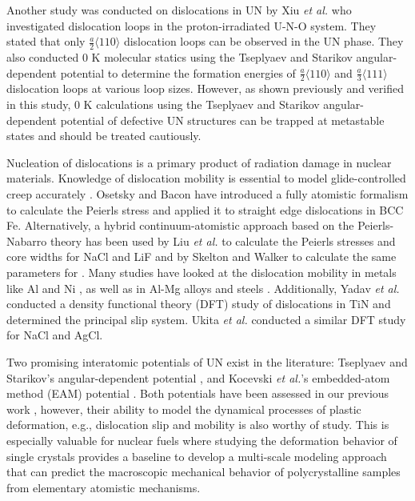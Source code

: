 \documentclass[applsci,article,submit,pdftex,moreauthors]{Definitions/mdpi}
\newcommand{\?}{\stackrel{?}{=}}
\begin{document}
Another study was conducted on dislocations in UN by Xiu \textit{et al.} \cite{Xiu2021} who investigated dislocation loops in the proton-irradiated U-N-O system. They stated that only $\frac{a}{2} \langle 110 \rangle$ dislocation loops can be observed in the UN phase. They also conducted 0 K molecular statics using the Tseplyaev and Starikov angular-dependent potential \cite{Tseplyaev2016} to determine the formation energies of $\frac{a}{2} \langle 110 \rangle$ and $\frac{a}{3} \langle 111 \rangle$ dislocation loops at various loop sizes. However, as shown previously \cite{AbdulHameed2024} and verified in this study, 0 K calculations using the Tseplyaev and Starikov angular-dependent potential \cite{Tseplyaev2016} of defective UN structures can be trapped at metastable states and should be treated cautiously. 

Nucleation of dislocations is a primary product of radiation damage in nuclear materials. Knowledge of dislocation mobility is essential to model glide-controlled creep accurately \cite{Skelton2017}. Osetsky and Bacon \cite{Osetsky2003} have introduced a fully atomistic formalism to calculate the Peierls stress and applied it to straight edge dislocations in BCC Fe. Alternatively, a hybrid continuum-atomistic approach based on the Peierls-Nabarro theory has been used by Liu \textit{et al.} \cite{Liu2012} to calculate the Peierls stresses and core widths for NaCl and LiF and by Skelton and Walker \cite{Skelton2017} to calculate the same parameters for . Many studies have looked at the dislocation mobility in metals like Al \cite{Cho2017, Dang2019} and Ni \cite{Olmsted2005}, as well as in Al-Mg alloys \cite{Olmsted2005} and steels \cite{Kaloni2023}. Additionally, Yadav \textit{et al.} \cite{Yadav2014} conducted a density functional theory (DFT) study of dislocations in TiN and determined the principal slip system. Ukita \textit{et al.} \cite{Ukita2018} conducted a similar DFT study for NaCl and AgCl.

Two promising interatomic potentials of UN exist in the literature: Tseplyaev and Starikov's angular-dependent potential \cite{Tseplyaev2016}, and Kocevski \textit{et al.}'s embedded-atom method (EAM) potential \cite{Kocevski2022II}. Both potentials have been assessed in our previous work \cite{AbdulHameed2024}, however, their ability to model the dynamical processes of plastic deformation, e.g., dislocation slip and mobility is also worthy of study. This is especially valuable for nuclear fuels where studying the deformation behavior of single crystals provides a baseline to develop a multi-scale modeling approach that can predict the macroscopic mechanical behavior of polycrystalline samples from elementary atomistic mechanisms.
\end{document}
